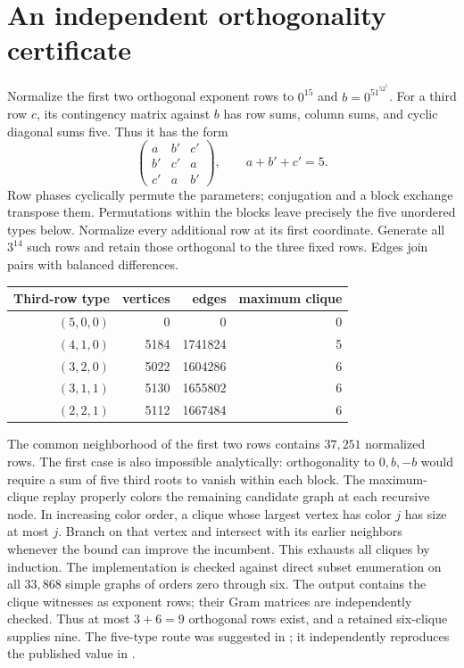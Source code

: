 \section{An independent orthogonality certificate}\label{app:orth-new}
Normalize the first two orthogonal exponent rows to $0^{15}$ and $b=0^51^52^5$. For a third row $c$, its contingency matrix against $b$ has row sums, column sums, and cyclic diagonal sums five. Thus it has the form
\[\begin{pmatrix}a&b'&c'\\b'&c'&a\\c'&a&b'\end{pmatrix},\qquad a+b'+c'=5.\]
Row phases cyclically permute the parameters; conjugation and a block exchange transpose them. Permutations within the blocks leave precisely the five unordered types below. Normalize every additional row at its first coordinate. Generate all $3^{14}$ such rows and retain those orthogonal to the three fixed rows. Edges join pairs with balanced differences.
\begin{center}\begin{tabular}{rrrr}\toprule
Third-row type&vertices&edges&maximum clique\\\midrule
$(5,0,0)$&0&0&0\\$(4,1,0)$&5184&1741824&5\\$(3,2,0)$&5022&1604286&6\\$(3,1,1)$&5130&1655802&6\\$(2,2,1)$&5112&1667484&6\\\bottomrule
\end{tabular}\end{center}
The common neighborhood of the first two rows contains $37{,}251$ normalized rows. The first case is also impossible analytically: orthogonality to $0,b,-b$ would require a sum of five third roots to vanish within each block.
The maximum-clique replay properly colors the remaining candidate graph at each recursive node. In increasing color order, a clique whose largest vertex has color $j$ has size at most $j$. Branch on that vertex and intersect with its earlier neighbors whenever the bound can improve the incumbent. This exhausts all cliques by induction. The implementation is checked against direct subset enumeration on all $33{,}868$ simple graphs of orders zero through six. The output contains the clique witnesses as exponent rows; their Gram matrices are independently checked.
Thus at most $3+6=9$ orthogonal rows exist, and a retained six-clique supplies nine. The five-type route was suggested in \cite{OCnotes}; it independently reproduces the published value in \cite{LO}.
